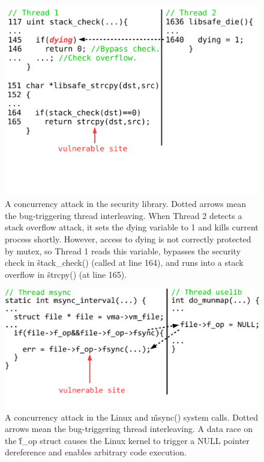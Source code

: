 \begin{figure}[h]
\vspace{-.1in}
\centering
\includegraphics[width=0.8\columnwidth]{figures/libsafe}
\vspace{-.55in}
\caption{{A concurrency attack in the \libsafe security library. } 
\rm{Dotted arrows mean the bug-triggering thread interleaving. When Thread 2 
detects a stack overflow attack, it sets the \v{dying} variable to 1 and kills 
current process shortly. However, access to \v{dying} is not correctly 
protected 
by mutex, so Thread 1 reads this variable, bypasses the security check in
\v{stack\_check()} (called at line 164), and runs into a 
stack overflow in \v{strcpy()} (at line 165).}}
\label{fig:libsafe}
\end{figure}

\begin{figure}[h]
\centering
\includegraphics[width=0.9\columnwidth]{figures/kernel_uselib_msync}
\vspace{-.25in}
\caption{{A concurrency attack in the Linux \uselib and \v{msync()} system 
calls. }\rm{Dotted arrows mean the bug-triggering thread interleaving. A data 
race on the \v{f\_op} struct causes the Linux kernel to trigger a NULL 
pointer dereference and enables arbitrary code execution.}} 
\label{fig:uselib}
\vspace{-.1in}
\end{figure}


